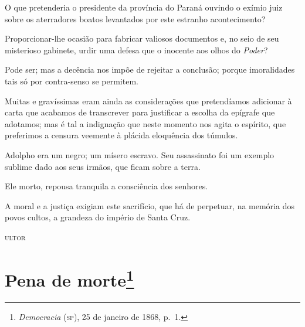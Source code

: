 O que pretenderia o presidente da província do Paraná ouvindo o exímio
juiz sobre os aterradores boatos levantados por este estranho
acontecimento?

Proporcionar-lhe ocasião para fabricar valiosos documentos e, no seio de
seu misterioso gabinete, urdir uma defesa que o inocente aos olhos do
\emph{Poder}?

Pode ser; mas a decência nos impõe de rejeitar a conclusão; porque
imoralidades tais só por contra-senso se permitem.

Muitas e gravíssimas eram ainda as considerações que pretendíamos
adicionar à carta que acabamos de transcrever para justificar a escolha
da epígrafe que adotamos; mas é tal a indignação que neste momento nos
agita o espírito, que preferimos a censura veemente à plácida eloquência
dos túmulos.

Adolpho era um negro; um mísero escravo. Seu assassinato foi um exemplo
sublime dado aos seus irmãos, que ficam sobre a terra.

Ele morto, repousa tranquila a consciência dos senhores.

A moral e a justiça exigiam este sacrifício, que há de perpetuar, na
memória dos povos cultos, a grandeza do império de Santa Cruz.

\begin{flushright}
\textsc{ultor}
\end{flushright}

\chapter{Pena de morte\footnote{\emph{Democracia} (\textsc{sp}), 25 de janeiro de 1868, p.~1.}}

